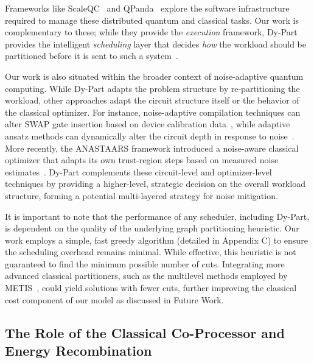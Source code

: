 \documentclass[pdflatex,sn-mathphys-num]{sn-jnl}
\theoremstyle{thmstyleone}
\theoremstyle{thmstyletwo}%
\theoremstyle{thmstylethree}%
\begin{document}
Frameworks like ScaleQC~\cite{Tang2022ScaleQCASX} and QPanda~\cite{Dou2022QPandaHQN} explore the software infrastructure required to manage these distributed quantum and classical tasks. Our work is complementary to these; while they provide the \textit{execution} framework, Dy-Part provides the intelligent \textit{scheduling} layer that decides \textit{how} the workload should be partitioned before it is sent to such a system~\cite{Xu2025GPUAcceleratedDQF, Eichhorn2025ProvideQAQT}.

Our work is also situated within the broader context of noise-adaptive quantum computing. While Dy-Part adapts the problem structure by re-partitioning the workload, other approaches adapt the circuit structure itself or the behavior of the classical optimizer. For instance, noise-adaptive compilation techniques can alter SWAP gate insertion based on device calibration data~\cite{gokhale2024faster}, while adaptive ansatz methods can dynamically alter the circuit depth in response to noise~\cite{tang2021qubit}. More recently, the ANASTAARS framework introduced a noise-aware classical optimizer that adapts its own trust-region steps based on measured noise estimates~\cite{dzahini2025noise}. Dy-Part complements these circuit-level and optimizer-level techniques by providing a higher-level, strategic decision on the overall workload structure, forming a potential multi-layered strategy for noise mitigation.

It is important to note that the performance of any scheduler, including Dy-Part, is dependent on the quality of the underlying graph partitioning heuristic. Our work employs a simple, fast greedy algorithm (detailed in Appendix C) to ensure the scheduling overhead remains minimal. While effective, this heuristic is not guaranteed to find the minimum possible number of cuts. Integrating more advanced classical partitioners, such as the multilevel methods employed by METIS~\cite{Karypis1998}, could yield solutions with fewer cuts, further improving the classical cost component of our model as discussed in Future Work.

\subsection{The Role of the Classical Co-Processor and Energy Recombination}
\end{document}
